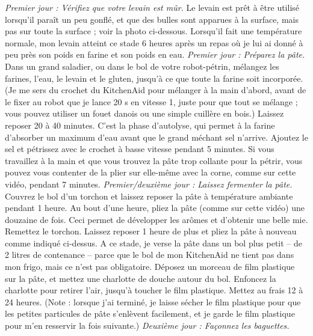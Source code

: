 \ingredient{}\textit{Premier jour : Vérifiez que votre levain est mûr.}
\ingredient{}Le levain est prêt à être utilisé lorsqu'il paraît un peu gonflé, et que des bulles sont apparues à la surface, mais pas sur toute la surface ; voir la photo ci-dessous. Lorsqu'il fait une température normale, mon levain atteint ce stade 6 heures après un repas où je lui ai donné à peu près son poids en farine et son poids en eau.
\ingredient{}
\ingredient{}\textit{Premier jour : Préparez la pâte.}
Dans un grand saladier, ou dans le bol de votre robot-pétrin, mélangez les farines, l'eau, le levain et le gluten, jusqu'à ce que toute la farine soit incorporée. (Je me sers du crochet du KitchenAid pour mélanger à la main d'abord, avant de le fixer au robot que je lance 20 s en vitesse 1, juste pour que tout se mélange ; vous pouvez utiliser un fouet danois ou une simple cuillère en bois.)
\ingredient{}Laissez reposer 20 à 40 minutes. C'est la phase d'autolyse, qui permet à la farine d'absorber un maximum d'eau avant que le grand méchant sel n'arrive.
Ajoutez le sel et pétrissez avec le crochet à basse vitesse pendant 5 minutes. Si vous travaillez à la main et que vous trouvez la pâte trop collante pour la pétrir, vous pouvez vous contenter de la plier sur elle-même avec la corne, comme sur cette vidéo, pendant 7 minutes.
\ingredient{}
\ingredient{}\textit{Premier/deuxième jour : Laissez fermenter la pâte.}
\ingredient{}Couvrez le bol d'un torchon et laissez reposer la pâte à température ambiante pendant 1 heure. Au bout d'une heure, pliez la pâte (comme sur cette vidéo) une douzaine de fois. Ceci permet de développer les arômes et d'obtenir une belle mie. Remettez le torchon.
\ingredient{}Laissez reposer 1 heure de plus et pliez la pâte à nouveau comme indiqué ci-dessus.
\ingredient{}A ce stade, je verse la pâte dans un bol plus petit -- de 2 litres de contenance -- parce que le bol de mon KitchenAid ne tient pas dans mon frigo, mais ce n'est pas obligatoire.
\ingredient{}Déposez un morceau de film plastique sur la pâte, et mettez une charlotte de douche autour du bol. Enfoncez la charlotte pour retirer l'air, jusqu'à toucher le film plastique. Mettez au frais 12 à 24 heures. (Note : lorsque j'ai terminé, je laisse sécher le film plastique pour que les petites particules de pâte s'enlèvent facilement, et je garde le film plastique pour m'en resservir la fois suivante.)
\ingredient{}
\ingredient{}\textit{Deuxième jour : Façonnez les baguettes.}
